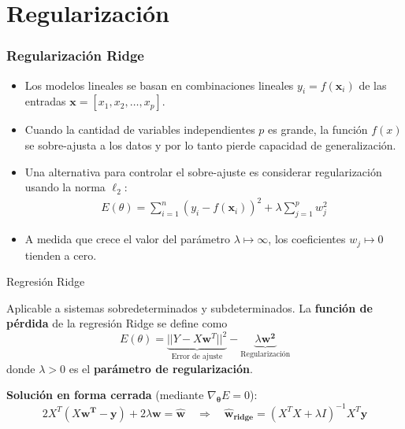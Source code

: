\documentclass[aspectratio=169, 10pt]{beamer}
\begin{document}
\section{Regularizaci\'on}
\begin{frame}
\frametitle{Regularizaci\'on Ridge}
\begin{itemize}
	\item Los modelos lineales se basan en combinaciones lineales $y_i=f(\mathbf x_i)$ de las entradas $\mathbf x=[x_1,x_2,\ldots,x_p]$.  
	\item Cuando la cantidad de variables independientes $p$ es grande, la funci\'on $f(x)$ se sobre-ajusta a los datos y por lo tanto pierde capacidad de generalizaci\'on.
	\item Una alternativa para controlar el sobre-ajuste es considerar regularizaci\'on usando la norma $\ell_2$:
	\begin{align*}
	E(\theta)=\sum_{i=1}^n (y_i-f(\mathbf x_i))^2+ \lambda \sum_{j=1}^p w_j^2
	\end{align*}
	\item A medida que crece el valor del par\'ametro $\lambda \mapsto \infty$, los coeficientes $w_j \mapsto 0$ tienden a cero.
	

\end{itemize}
\end{frame}

\begin{frame}{Regresión Ridge}
	\begin{block}{Aplicable a sistemas sobredeterminados y subdeterminados.}
		La \textbf{función de pérdida} de la regresión Ridge se define como
		\[
		E(\theta) = 
	\underbrace{||Y- X\mathbf w^T||^2}_{\text{Error de ajuste}} 
	-  \underbrace{\lambda \bm{w^2}}_{\text{Regularización}}
	\]
		donde $\lambda > 0$ es el \textbf{parámetro de regularización}.
	\end{block}
	
	\bigskip
	\textbf{Solución en forma cerrada} (mediante $\nabla_{\bm{\theta}}E = 0$):
	\[
	2X^T(X\bm{w^T} - \bm{y}) + 2\lambda\bm{w} = \bm{\hat w}
	\quad\Longrightarrow\quad
	\boxed{\bm{\hat w_{ridge}} = (X^TX + \lambda I)^{-1}X^T\bm{y}}
	\]
	
\end{frame}
\end{document}
